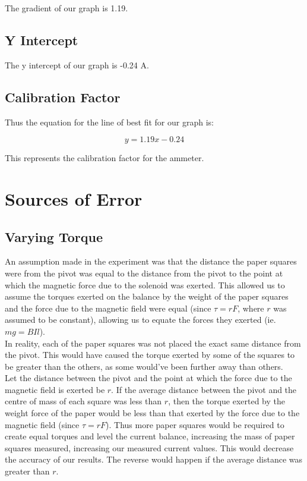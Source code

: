 \documentclass[a4paper,11pt]{article}
\begin{document}
The gradient of our graph is 1.19.


\subsection{Y Intercept}

The y intercept of our graph is -0.24 A.


\subsection{Calibration Factor}

Thus the equation for the line of best fit for our graph is:

$$
y = 1.19 x - 0.24
$$

This represents the calibration factor for the ammeter.


\section{Sources of Error}

\subsection{Varying Torque}

An assumption made in the experiment was that the distance the paper squares
were from the pivot was equal to the distance from the pivot to the point at
which the magnetic force due to the solenoid was exerted. This allowed us to
assume the torques exerted on the balance by the weight of the paper squares and
the force due to the magnetic field were equal (since $\tau = r F$, where $r$
was assumed to be constant), allowing us to equate the forces they exerted
(ie. $mg = BIl$). \\

In reality, each of the paper squares was not placed the exact same distance
from the pivot. This would have caused the torque exerted by some of the squares
to be greater than the others, as some would've been further away than others. \\

Let the distance between the pivot and the point at which the force due to the
magnetic field is exerted be $r$. If the average distance between the pivot and
the centre of mass of each square was less than $r$, then the torque exerted by
the weight force of the paper would be less than that exerted by the force due
to the magnetic field (since $\tau = r F$). Thus more paper squares would be
required to create equal torques and level the current balance, increasing the
mass of paper squares
measured, increasing our measured current values. This would decrease the
accuracy of our results. The reverse would happen if the average distance was
greater than $r$. \\
\end{document}
